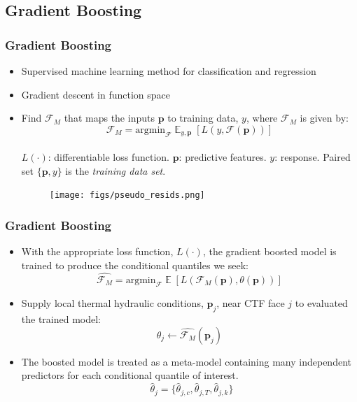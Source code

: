\documentclass[t, pdftex]{beamer}
\DeclareMathOperator*{\E}{\mathbb{E}}
\begin{document}
\subsection*{Gradient Boosting}
\begin{frame}
\frametitle{Gradient Boosting}
\vspace{-8pt}
\begin{itemize}
    \item Supervised machine learning method for classification and regression
    \item Gradient descent in function space
    \item Find $\mathcal F_M$ that maps the inputs $\mathbf p$ to training data, $y$, where $\mathcal F_M$ is given by:
    \[
    \mathcal F_M = \text{argmin}_{\mathcal F} \E_{y, \mathbf p} [ L(y, \mathcal F(\mathbf p)) ]
    \]\\
    $L(\cdot)$: differentiable loss function.  $\mathbf p$: predictive features. $y$: response.  Paired set $\{\mathbf p, y \}$ is the \emph{training data set}.
\begin{figure}[!htbp]
    \centering
    \texttt{[image: figs/pseudo\_resids.png]}
    \label{model_overview}
\end{figure}
\end{itemize}
\cite{prett2014}
\end{frame}

\begin{frame}
\frametitle{Gradient Boosting}
\vspace{-8pt}
\begin{itemize}
    \item With the appropriate loss function, $L(\cdot)$, the gradient boosted model is trained to produce the conditional quantiles we seek:
    \[
     \hat{\mathcal F_M} =  \mathrm{argmin}_{\mathcal F}
     \E [ L(\mathcal{F}_M (\mathbf p), \theta(\mathbf p)) ]
    \]
    \item Supply local thermal hydraulic conditions, $\mathbf p_j$, near CTF face $j$ to evaluated the trained model:
    \[
    \hat \theta_j \leftarrow \hat{\mathcal F_M}(\mathbf p_j)
    \]
    \item  The boosted model is treated as a meta-model containing many independent predictors for each conditional quantile of interest.
    \[
    \ \ \hat \theta_j = \{\hat \theta_{j,c}, \hat \theta_{j,T}, \hat \theta_{j,k} \}
    \]
\end{itemize}
\cite{friedman2001}
\end{frame}
\end{document}

